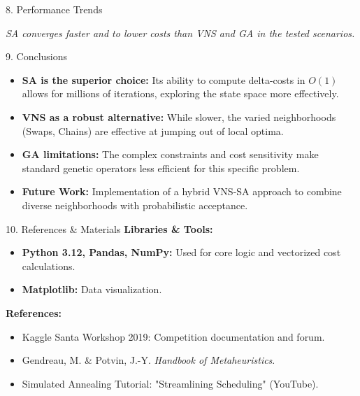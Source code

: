 \documentclass[aspectratio=169]{beamer}
\begin{document}
\begin{frame}{8. Performance Trends}
\begin{center}
\end{center}
\textit{SA converges faster and to lower costs than VNS and GA in the tested scenarios.}
\end{frame}

\begin{frame}{9. Conclusions}
\begin{itemize}
    \item \textbf{SA is the superior choice:} Its ability to compute delta-costs in $O(1)$ allows for millions of iterations, exploring the state space more effectively.
    \item \textbf{VNS as a robust alternative:} While slower, the varied neighborhoods (Swaps, Chains) are effective at jumping out of local optima.
    \item \textbf{GA limitations:} The complex constraints and cost sensitivity make standard genetic operators less efficient for this specific problem.
    \item \textbf{Future Work:} Implementation of a hybrid VNS-SA approach to combine diverse neighborhoods with probabilistic acceptance.
\end{itemize}
\end{frame}

\begin{frame}{10. References \& Materials}
\textbf{Libraries \& Tools:}
\begin{itemize}
    \item \textbf{Python 3.12, Pandas, NumPy:} Used for core logic and vectorized cost calculations.
    \item \textbf{Matplotlib:} Data visualization.
\end{itemize}

\textbf{References:}
\begin{itemize}
    \item Kaggle Santa Workshop 2019: Competition documentation and forum.
    \item Gendreau, M. \& Potvin, J.-Y. \textit{Handbook of Metaheuristics}.
    \item Simulated Annealing Tutorial: "Streamlining Scheduling" (YouTube).
\end{itemize}
\end{frame}
\end{document}
